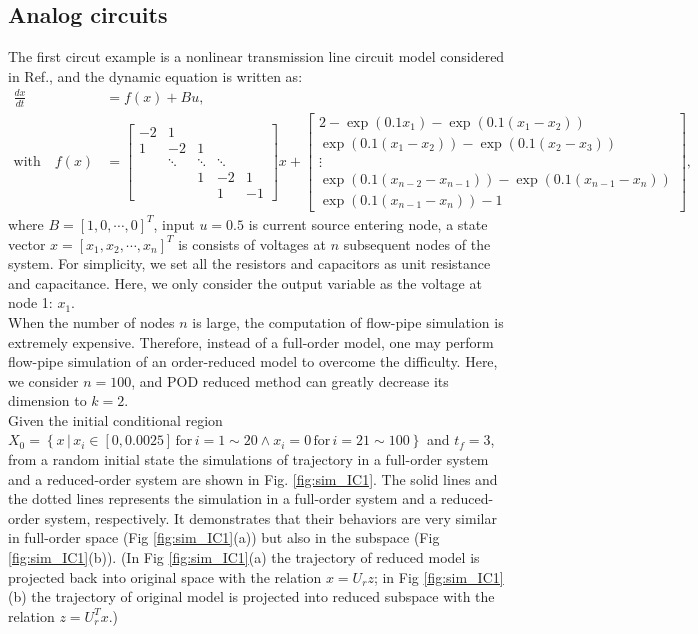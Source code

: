 \documentclass[runningheads,a4paper]{llncs}
\theoremstyle{definition}
\theoremstyle{plain}
\begin{document}
\subsection{Analog circuits}
The first circut example is a nonlinear transmission line circuit model considered in Ref.\cite{Chen00aquadratic}, and the dynamic equation is written as:
\begin{align}
\frac{dx}{dt}&=f(x)+Bu,\\
\mbox{with}\quad f(x)&=
\begin{bmatrix}
    -2 & 1 &   &   &  \\
    1  & -2 & 1 &   &  \\
        & \ddots & \ddots & \ddots &  \\
        &    & 1 & -2  & 1\\
        &    &   & 1 & -1
\end{bmatrix} x +
\begin{bmatrix}
    2-\exp(0.1x_1)-\exp(0.1(x_1-x_2))   \\
    \exp(0.1(x_1-x_2))-\exp(0.1(x_2-x_3))  \\
        \vdots \\
     \exp(0.1(x_{n-2}-x_{n-1}))-\exp(0.1(x_{n-1}-x_{n}))\\
      \exp(0.1(x_{n-1}-x_n))-1
\end{bmatrix},
\end{align}
where $B=[1,0,\cdots,0]^T$,  input $u=0.5$ is current source entering node, a state vector $x=[x_1,x_2,\cdots,x_n]^T$ is consists of voltages at $n$ subsequent nodes of the system. For simplicity, we set all the resistors and capacitors as unit resistance and capacitance. Here, we only consider the output variable as the voltage at node 1: $x_1$.\\
When the number of nodes $n$ is large, the computation of flow-pipe simulation is extremely expensive. Therefore, instead of a full-order model, one may perform flow-pipe simulation of an order-reduced model to overcome the difficulty. Here, we consider $n=100$, and POD reduced method can greatly decrease its dimension to $k=2$.\\
 Given the initial conditional region $X_0=\left\{x \, |\, x_i \in [0,0.0025]  \, \mbox{for}\, i=1\sim20 \wedge x_i=0 \,  \mbox{for}\, i=21\sim100 \right\}$ and $t_f=3$, from a random initial state the simulations of trajectory in a full-order system and  a reduced-order system are shown in Fig. \ref{fig:sim_IC1}. The solid lines and the dotted lines represents the simulation in a full-order system and a reduced-order system, respectively. It demonstrates that their behaviors are very similar in full-order space (Fig \ref{fig:sim_IC1}(a)) but also in the subspace (Fig \ref{fig:sim_IC1}(b)). (In Fig \ref{fig:sim_IC1}(a) the trajectory of reduced model is projected back into original space with the relation $x=U_r z$; in Fig \ref{fig:sim_IC1}(b) the trajectory of original model is projected into reduced subspace with the relation $z=U_r^T x$.)  \\
\end{document}
